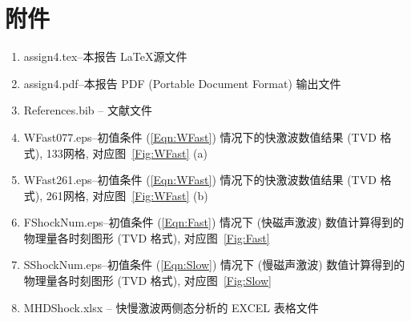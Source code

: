 \documentclass[10.5pt
]{article}
\begin{document}
\section{附件}
\begin{enumerate}
\item
assign4.tex--本报告 \LaTeX 源文件
\item
assign4.pdf--本报告 PDF (Portable Document Format) 输出文件
\item
References.bib -- 文献文件
\item
WFast077.eps--初值条件 (\ref{Eqn:WFast}) 情况下的快激波数值结果 (TVD 格式), 133网格, 对应图~\ref{Fig:WFast} (a)
\item
WFast261.eps--初值条件 (\ref{Eqn:WFast}) 情况下的快激波数值结果 (TVD 格式), 261网格, 对应图~\ref{Fig:WFast} (b)
\item
FShockNum.eps--初值条件 (\ref{Eqn:Fast}) 情况下 (快磁声激波) 数值计算得到的物理量各时刻图形 (TVD 格式), 对应图~\ref{Fig:Fast}
\item
SShockNum.eps--初值条件 (\ref{Eqn:Slow}) 情况下 (慢磁声激波) 数值计算得到的物理量各时刻图形 (TVD 格式), 对应图~\ref{Fig:Slow}
\item
MHDShock.xlsx -- 快慢激波两侧态分析的 EXCEL 表格文件
\end{enumerate}


% 
%


\end{document}
